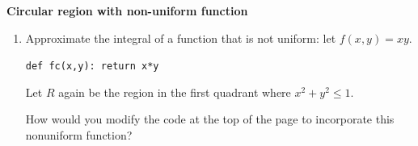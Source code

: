 \documentclass[12pt,letterpaper,noanswers]{exam}
\begin{document}
\noindent\textbf{Circular region with non-uniform function}
\begin{enumerate}[resume=classQ]
    \item Approximate the integral of a function that is not uniform: let $f(x,y) = xy$.
    
    \texttt{def fc(x,y): return x*y}
    
    Let $R$ again be the region in the first quadrant where $x^2+y^2\leq 1$.
    

    
    How would you modify the code at the top of the page to incorporate this nonuniform function?
\end{enumerate}




\end{document}
